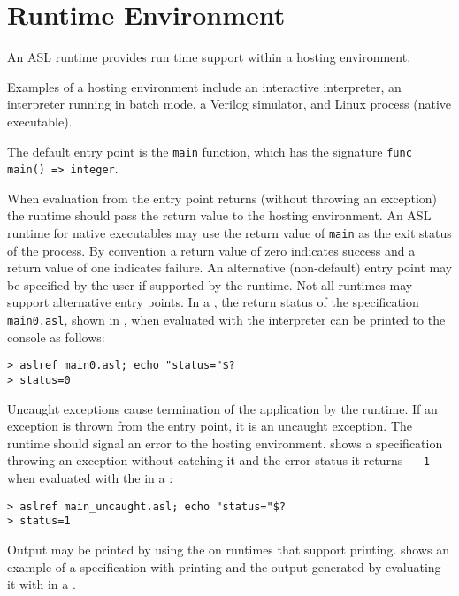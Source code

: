 \chapter{Runtime Environment\label{chap:RuntimeEnvironment}}

An ASL runtime provides run time support within a hosting environment.

Examples of a hosting environment include an interactive interpreter,
an interpreter running in batch mode,
a Verilog simulator, and Linux process (native executable).

The default entry point is the \texttt{main} function, which has the signature
\verb|func main() => integer|.

When evaluation from the entry point returns (without throwing an exception)
the runtime should pass the return value to the hosting environment.
%
An ASL runtime for native executables may use the return value
of \texttt{main} as the exit status of the process.
%
By convention a return value of zero indicates success and a return value of
one indicates failure.
%
An alternative (non-default) entry point may be specified by the user if
supported by the runtime. Not all runtimes may support alternative entry points.
%
In a \linuxbashshell{}, the return status of the specification \texttt{main0.asl},
shown in ,
when evaluated with the \aslref{}
interpreter can be printed to the console as follows:
\begin{Verbatim}[frame=single]
> aslref main0.asl; echo "status="$?
> status=0
\end{Verbatim}


Uncaught exceptions cause termination of the application by the runtime.
If an exception is thrown from the entry point, it is an uncaught exception.
The runtime should signal an error to the hosting environment.
%
 shows a specification throwing an exception
without catching it and the error status it returns --- \texttt{1} ---
when evaluated with the \aslref{} in a \linuxbashshell{}:
\begin{verbatim}
> aslref main_uncaught.asl; echo "status="$?
> status=1
\end{verbatim}


Output may be printed by using the \printstatementterm{} on
runtimes that support printing.
%
 shows an example of a specification
with printing and the output generated by evaluating it with \aslref{}
in a \linuxbashshell{}.
